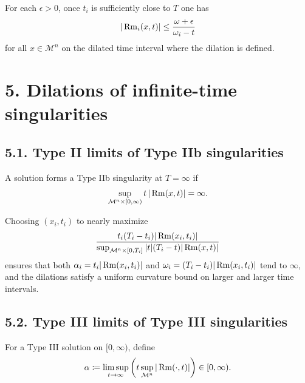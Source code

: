 \begin{remark}
\label{ch08-rem-type-i-curvature-bound-after-rescaling}
For each \(\epsilon>0\), once \(t_i\) is sufficiently close to \(T\) one has
\[
|\operatorname{Rm}_i(x,t)|\le \frac{\omega+\epsilon}{\omega_i-t}
\]
for all \(x\in\mathcal M^n\) on the dilated time interval where the dilation is defined.
\end{remark}

\section*{5. Dilations of infinite-time singularities}

\subsection*{5.1. Type II limits of Type IIb singularities}

\begin{remark}
\label{ch08-rem-type-iib-condition}
A solution forms a Type IIb singularity at \(T=\infty\) if
\[
\sup_{\mathcal M^n\times[0,\infty)} t\,|\operatorname{Rm}(x,t)|=\infty.
\]
\end{remark}

\begin{remark}
\label{ch08-rem-refined-type-iib-rescaling}
Choosing \((x_i,t_i)\) to nearly maximize
\[
\frac{t_i(T_i-t_i)|\operatorname{Rm}(x_i,t_i)|}{\sup_{\mathcal M^n\times[0,T_i]}|t|(T_i-t)|\operatorname{Rm}(x,t)|}
\]
ensures that both \(\alpha_i=t_i|\operatorname{Rm}(x_i,t_i)|\) and \(\omega_i=(T_i-t_i)|\operatorname{Rm}(x_i,t_i)|\) tend to \(\infty\), and the dilations satisfy a uniform curvature bound on larger and larger time intervals.
\end{remark}

\subsection*{5.2. Type III limits of Type III singularities}

\begin{definition}
\label{ch08-def-type-iii-limsup-scale}
For a Type III solution on \([0,\infty)\), define
\[
\alpha\coloneqq \limsup_{t\to\infty}\left(t\sup_{\mathcal M^n}|\operatorname{Rm}(\cdot,t)|\right)\in[0,\infty).
\]
\end{definition}


